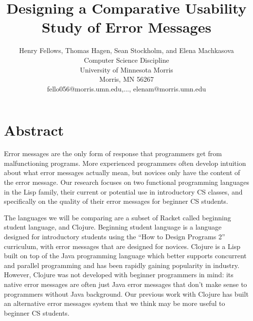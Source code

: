 \documentclass[12pt]{article}
\newcommand{\comment}[1]{{\bf \tt  {#1}}}
\begin{document}
\pagestyle{plain}
%

\title{Designing a Comparative Usability Study of Error Messages}
%
%

\author{
Henry Fellows, Thomas Hagen, Sean Stockholm, and Elena Machkasova \\
Computer Science Discipline \\
University of Minnesota Morris\\
Morris, MN 56267\\
fello056@morris.umn.edu,..., elenam@morris.umn.edu
}
\date{}
\maketitle
\thispagestyle{empty}

\section*{\centering Abstract}
Error messages are the only form of response that programmers get from malfunctioning programs. More experienced programmers often develop intuition about what error messages actually mean, but novices only have the content of the error message. Our research focuses on two functional programming languages in the Lisp family, their current or potential use in introductory CS classes, and specifically on the quality of their error messages for beginner CS students. 

The languages we will be comparing are a subset of Racket called beginning student language, and Clojure. Beginning student language is a language designed for introductory students using the “How to Design Programs 2” curriculum, with error messages that are designed for novices. Clojure is a Lisp built on top of the Java programming language which better supports concurrent and parallel programming and has been rapidly gaining popularity in industry. However, Clojure was not developed with beginner programmers in mind: its native error messages are often just Java error messages that don’t make sense to programmers without Java background. Our previous work with Clojure has built an alternative error messages system that we think may be more useful to beginner CS students. 
\end{document}
